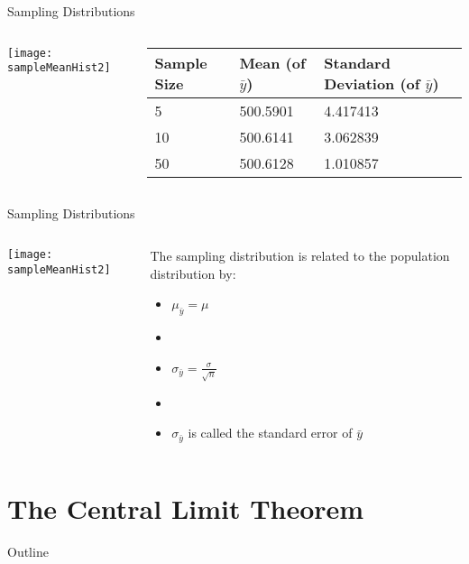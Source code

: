 \documentclass[xcolor=dvipsnames]{beamer}
\begin{document}
\begin{frame}{Sampling Distributions}
	\begin{columns}
		\begin{column}{.5 \textwidth}
			\begin{center}
				\texttt{[image: sampleMeanHist2]}
			\end{center}
		\end{column}
		\begin{column}{.5 \textwidth}
			\begin{tabular}{|p{1.25cm}|p{1.7cm}|p{1.75cm}|} \hline
				\textbf{Sample Size}   &  \textbf{Mean (of $\bar{y}$)}  &  \textbf{Standard Deviation (of $\bar{y}$)} \\ \hline \hline
				5 &500.5901& 4.417413 \\ \hline
				10 &500.6141& 3.062839 \\ \hline
				50& 500.6128 &1.010857 \\ \hline
			\end{tabular}
		\end{column}
	\end{columns}
\end{frame}

\begin{frame}{Sampling Distributions}
	\begin{columns}
		\begin{column}{.5 \textwidth}
			\begin{center}
				\texttt{[image: sampleMeanHist2]}
			\end{center}
		\end{column}
		\begin{column}{.5 \textwidth}
			The sampling distribution is related to the population distribution by:
			\begin{itemize}
				\item $\mu_{\bar{y}} = \mu$ 
				\item[]
				\item $\sigma_{\bar{y}} =\frac{\sigma}{\sqrt{n}} $
				\item[]
				\item $\sigma_{\bar{y}}$ is called the standard error of $\bar{y}$
			\end{itemize}
		\end{column}
	\end{columns}
\end{frame}

\section{The Central Limit Theorem}
\begin{frame}{Outline}
	\tableofcontents[currentsection,subsectionstyle=show/shaded/hide]
\end{frame}
\end{document}
